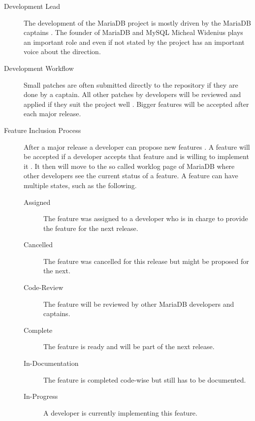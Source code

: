 \begin{description}
  \begin{description}

    \item[Development Lead] The development of the MariaDB project is mostly
      driven by the MariaDB captains \cite{MySQLContributing,MySQLDevelopers}.
      The founder of MariaDB and MySQL Micheal Widenius plays an important role
      and even if not stated by the project has an important voice about the
      direction.

    \item[Development Workflow] Small patches are often submitted directly to
      the repository if they are done by a captain. All other patches by
      developers will be reviewed and applied if they suit the project well
      \cite{MySQLRoadmap,MySQLPlans}. Bigger features will be accepted after
      each major release.

    \item[Feature Inclusion Process] After a major release a developer can
      propose new features \cite{MySQLPlans}. A feature will be accepted if a
      developer accepts that feature and is willing to implement it
      \cite{MySQLContributingCode,MySQLContributing}. It then will move to the
      so called worklog page of MariaDB where other developers see the current
      status of a feature. A feature can have multiple states, such as the
      following.

      \begin{description}

        \item[Assigned] The feature was assigned to a developer who is in
          charge to provide the feature for the next release.

        \item[Cancelled] The feature was cancelled for this release but might
          be proposed for the next.

        \item[Code-Review] The feature will be reviewed by other MariaDB
          developers and captains.

        \item[Complete] The feature is ready and will be part of the next
          release.

        \item[In-Documentation] The feature is completed code-wise but still
          has to be documented.

        \item[In-Progress] A developer is currently implementing this feature.


\end{description}
\end{description}
\end{description}
